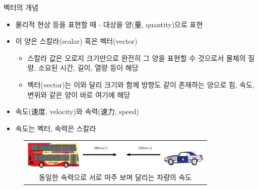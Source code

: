 \documentclass{beamer}
\begin{document}
\begin{frame}{벡터의 개념}

\begin{itemize}
\item 물리적 현상 등을 표현할 때 - 대상을 양(量, quantity)으로 표현 
\item 이 양은 스칼라(scalar) 혹은 벡터(vector)
	\begin{itemize}
	\item 스칼라 값은 오로지 크기만으로 완전히 그 양을 표현할 수 것으로서 물체의 질량, 소요된 시간, 길이, 열량 등이 해당
	\item 벡터(vector)는 이와 달리 크기와 함께 방향도 같이 존재하는 양으로 힘, 속도, 변위와 같은 양이 바로 여기에 해당
	\end{itemize}
\end{itemize}

\begin{itemize}
\item 속도(速度, velocity)와 속력(速力, speed)
\item 속도는 벡터, 속력은 스칼라
\end{itemize}

\begin{figure}
\begin{tabular}{c}
\includegraphics[width=9.25cm]{./Math_vector/movingVehicles.eps} \\
{\tiny 동일한 속력으로 서로 마주 보며 달리는 차량의 속도 }
\end{tabular}
\end{figure}
\end{frame}
\end{document}
